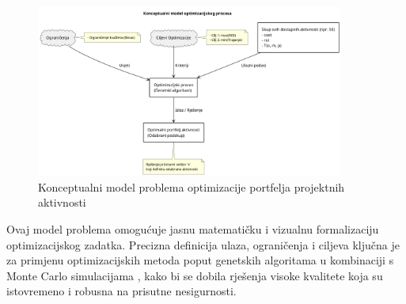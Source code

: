 \begin{figure}[H]
    \centering
    \includegraphics[width=0.9\textwidth]{slike/model_problema.png}
    \caption{Konceptualni model problema optimizacije portfelja projektnih aktivnosti}
    \label{fig:konceptualni_model}
\end{figure}

Ovaj model problema omogućuje jasnu matematičku i vizualnu formalizaciju optimizacijskog zadatka. Precizna definicija ulaza, ograničenja i ciljeva ključna je za primjenu optimizacijskih metoda poput genetskih algoritama \cite{Mitchell1998} u kombinaciji s Monte Carlo simulacijama \cite{Rubinstein2016}, kako bi se dobila rješenja visoke kvalitete koja su istovremeno i robusna na prisutne nesigurnosti.
